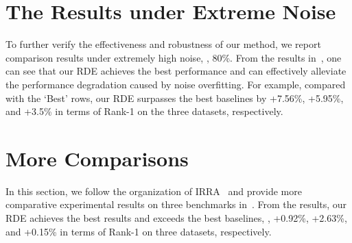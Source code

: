 \documentclass[10pt,twocolumn,letterpaper]{article}
\begin{document}
\section{The Results under Extreme Noise\label{app3}}
To further verify the effectiveness and robustness of our method, we report comparison results under extremely high noise, \ie, 80\%. From the results in~, one can see that our RDE achieves the best performance and can effectively alleviate the performance degradation caused by noise overfitting. For example, compared with the ‘Best’ rows, our RDE surpasses the best baselines by +7.56\%, +5.95\%, and +3.5\%  in terms of Rank-1 on the three datasets, respectively.





\section{More Comparisons \label{app4}}
In this section, we follow the organization of IRRA~\cite{jiang2023cross} and provide more comparative experimental results on three benchmarks in~. From the results, our RDE achieves the best results and exceeds the best baselines, \ie, +0.92\%, +2.63\%, and +0.15\% in terms of Rank-1 on three datasets, respectively.
\end{document}
